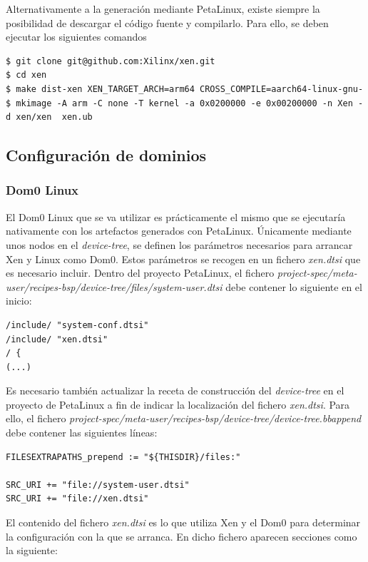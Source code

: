 Alternativamente a la generación mediante PetaLinux, existe siempre la posibilidad de descargar el código fuente y compilarlo. Para ello, se deben ejecutar los siguientes comandos \cite{xen_source_xilinx}

\begin{lstlisting}[style=CStyle]
$ git clone git@github.com:Xilinx/xen.git
$ cd xen
$ make dist-xen XEN_TARGET_ARCH=arm64 CROSS_COMPILE=aarch64-linux-gnu-
$ mkimage -A arm -C none -T kernel -a 0x0200000 -e 0x00200000 -n Xen -d xen/xen  xen.ub
\end{lstlisting}

\subsection{Configuración de dominios}
\subsubsection{Dom0 Linux} \label{xen_dom0_config}

El Dom0 Linux que se va utilizar es prácticamente el mismo que se ejecutaría nativamente con los artefactos generados con PetaLinux. Únicamente mediante unos nodos en el \textit{device-tree}, se definen los parámetros necesarios para arrancar Xen y Linux como Dom0. Estos parámetros se recogen en un fichero \textit{xen.dtsi} que es necesario incluir. Dentro del proyecto PetaLinux, el fichero \textit{project-spec/meta-user/recipes-bsp/device-tree/files/system-user.dtsi} debe contener lo siguiente en el inicio:

\begin{lstlisting}[style=CStyle]
/include/ "system-conf.dtsi"
/include/ "xen.dtsi"
/ {
(...)
\end{lstlisting}

Es necesario también actualizar la receta de construcción del \textit{device-tree} en el proyecto de PetaLinux a fin de indicar la localización del fichero \textit{xen.dtsi}. Para ello, el fichero \textit{project-spec/meta-user/recipes-bsp/device-tree/device-tree.bbappend} debe contener las siguientes líneas:

\begin{lstlisting}[style=CStyle]
FILESEXTRAPATHS_prepend := "${THISDIR}/files:"

SRC_URI += "file://system-user.dtsi"
SRC_URI += "file://xen.dtsi"
\end{lstlisting}

El contenido del fichero \textit{xen.dtsi} es lo que utiliza Xen y el Dom0 para determinar la configuración con la que se arranca. En dicho fichero aparecen secciones como la siguiente:

